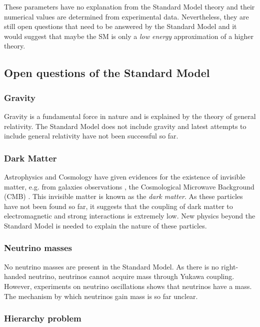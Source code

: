 These parameters have no explanation from the Standard Model theory and their numerical values are determined from experimental data. Nevertheless, they are still open questions that need to be answered by the Standard Model and it would suggest that maybe the SM is only a \textit{low energy} approximation of a higher theory.

\subsection{Open questions of the Standard Model}

\subsubsection*{Gravity}

Gravity is a fundamental force in nature and is explained by the theory of general relativity. The Standard Model does not include gravity and latest attempts to include general relativity have not been successful so far.

\subsubsection*{Dark Matter}

Astrophysics and Cosmology have given evidences for the existence of invisible matter, e.g. from galaxies observations \cite{Battistelli:2017zrp}, the Cosmological Microwave Background (CMB) \cite{Giesen:2012rp}. This invisible matter is known as the \textit{dark matter}. As these particles have not been found so far, it suggests that the coupling of dark matter to electromagnetic and strong interactions is extremely low. New physics beyond the Standard Model is needed to explain the nature of these particles.

\subsubsection*{Neutrino masses}

No neutrino masses are present in the Standard Model. As there is no right-handed neutrino, neutrinos cannot acquire mass through Yukawa coupling. However, experiments on neutrino oscillations \cite{Dore:2008dp} shows that neutrinos have a mass. The mechanism by which neutrinos gain mass is so far unclear.

\subsubsection*{Hierarchy problem}

